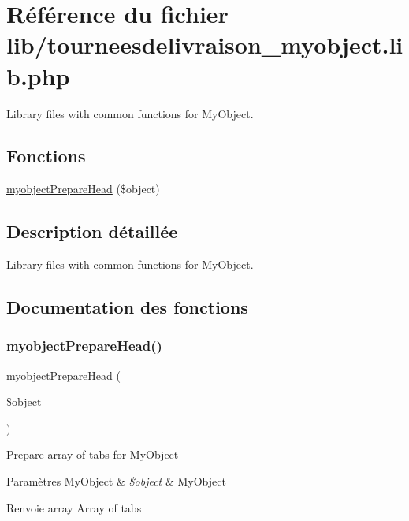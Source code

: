 \hypertarget{tourneesdelivraison__myobject_8lib_8php}{}\section{Référence du fichier lib/tourneesdelivraison\+\_\+myobject.lib.\+php}
\label{tourneesdelivraison__myobject_8lib_8php}


Library files with common functions for My\+Object.  


\subsection*{Fonctions}
\begin{DoxyCompactItemize}
\item 
\hyperlink{tourneesdelivraison__myobject_8lib_8php_abbf0497bb89ef73004eca5403dd6c1bd}{myobject\+Prepare\+Head} (\$object)
\end{DoxyCompactItemize}


\subsection{Description détaillée}
Library files with common functions for My\+Object. 



\subsection{Documentation des fonctions}
\mbox{\label{tourneesdelivraison__myobject_8lib_8php_abbf0497bb89ef73004eca5403dd6c1bd}} 
\subsubsection{\texorpdfstring{myobject\+Prepare\+Head()}{myobjectPrepareHead()}}
{\footnotesize\ttfamily myobject\+Prepare\+Head (\begin{DoxyParamCaption}\item[{}]{\$object }\end{DoxyParamCaption})}

Prepare array of tabs for My\+Object


\begin{DoxyParams}[1]{Paramètres}
My\+Object & {\em \$object} & My\+Object \\
\hline
\end{DoxyParams}
\begin{DoxyReturn}{Renvoie}
array Array of tabs 
\end{DoxyReturn}
